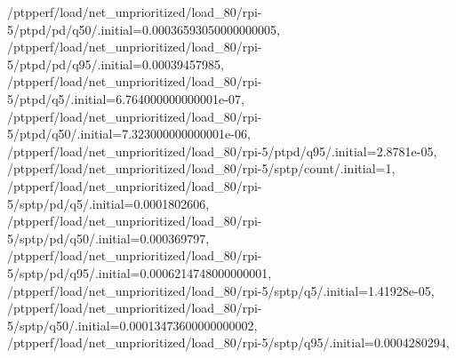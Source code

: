 {    /ptpperf/load/net_unprioritized/load_80/rpi-5/ptpd/pd/q50/.initial=0.00036593050000000005,
    /ptpperf/load/net_unprioritized/load_80/rpi-5/ptpd/pd/q95/.initial=0.00039457985,
    /ptpperf/load/net_unprioritized/load_80/rpi-5/ptpd/q5/.initial=6.764000000000001e-07,
    /ptpperf/load/net_unprioritized/load_80/rpi-5/ptpd/q50/.initial=7.323000000000001e-06,
    /ptpperf/load/net_unprioritized/load_80/rpi-5/ptpd/q95/.initial=2.8781e-05,
    /ptpperf/load/net_unprioritized/load_80/rpi-5/sptp/count/.initial=1,
    /ptpperf/load/net_unprioritized/load_80/rpi-5/sptp/pd/q5/.initial=0.0001802606,
    /ptpperf/load/net_unprioritized/load_80/rpi-5/sptp/pd/q50/.initial=0.000369797,
    /ptpperf/load/net_unprioritized/load_80/rpi-5/sptp/pd/q95/.initial=0.0006214748000000001,
    /ptpperf/load/net_unprioritized/load_80/rpi-5/sptp/q5/.initial=1.41928e-05,
    /ptpperf/load/net_unprioritized/load_80/rpi-5/sptp/q50/.initial=0.00013473600000000002,
    /ptpperf/load/net_unprioritized/load_80/rpi-5/sptp/q95/.initial=0.0004280294,}